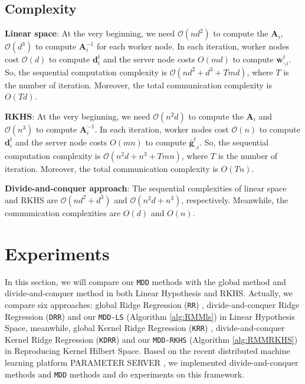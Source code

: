 \documentclass{article}
\begin{document}
\subsection{Complexity}
\textbf{Linear space}: At the very beginning, we need $\mathcal{O}\left(nd^2\right)$
to compute the $\mathbf A_i$,  $\mathcal{O}(d^3)$ to compute $\mathbf A_i^{-1}$ for each worker node.
In each iteration, worker nodes cost $\mathcal{O}(d)$ to compute $\mathbf d^t_i$ and
the server node costs $O(md)$ to compute $\bar{\mathbf w}^{t}_{\backslash i}$.
So, the sequential computation complexity is $\mathcal{O}\left(nd^2+d^3+Tmd\right)$, where $T$ is the number of iteration.
Moreover, the total communication complexity is $O(Td)$.

\textbf{RKHS}: At the very beginning, we need $\mathcal{O}\left(n^2d\right)$ to compute the $\mathbf A_i$
and $\mathcal{O}(n^3)$ to compute $\mathbf A_i^{-1}$.
In each iteration, worker nodes cost $\mathcal{O}(n)$ to compute $\mathbf d^t_i$
and the server node costs $O(mn)$ to compute $\bar{\mathbf g}^{t}_{\backslash i}$.
So, the sequential computation complexity is $\mathcal{O}\left(n^2d+n^3+Tmn\right)$, where $T$ is the number of iteration.
Moreover, the total communication complexity is $O(Tn)$.

\textbf{Divide-and-conquer approach}: The sequential complexities of linear space and RKHS
are $\mathcal{O}\left(nd^2+d^3\right)$ and $\mathcal{O}\left(n^2d+n^3\right)$, respectively.
Meanwhile, the communication complexities are $O(d)$ and $O(n)$.


\section{Experiments}
In this section, we will compare our  \texttt{MDD} methods with the global method and divide-and-conquer method in both Linear Hypothesis and RKHS.
Actually, we compare six approaches: global Ridge Regression (\texttt{RR}) \cite{hoerl1970ridge},
divide-and-conquer Ridge Regression (\texttt{DRR}) and our \texttt{MDD-LS} (Algorithm \ref{alg:RMMls}) in Linear Hypothesis Space,
meanwhile, global Kernel Ridge Regression (\texttt{KRR}) \cite{an2007fast},
divide-and-conquer Kernel Ridge Regression (\texttt{KDRR}) \cite{Zhang2013} and our \texttt{MDD-RKHS} (Algorithm \ref{alg:RMMRKHS}) in Reproducing Kernel Hilbert Space.
Based on the recent distributed machine learning platform PARAMETER SERVER \cite{li2014scaling},
we implemented divide-and-conquer methods and \texttt{MDD} methods and do experiments on this framework.
\end{document}
